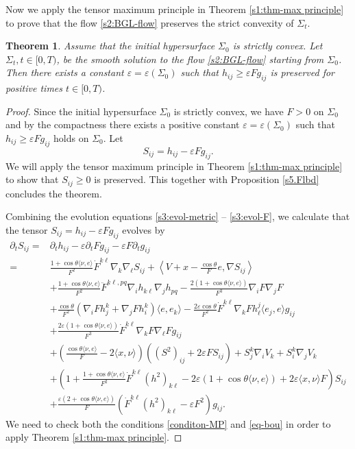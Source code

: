 \documentclass[11pt,reqno]{amsart}
\newtheorem{thm}{Theorem}[section]
\theoremstyle{definition}
\theoremstyle{remark}
\numberwithin{equation}{section}
\renewcommand{\(}{\left(}
\renewcommand{\)}{\right)}
\renewcommand{\-}{\overline}
\newcommand{\e}{\varepsilon}
\renewcommand{\t}{\theta}
\begin{document}
Now we apply the tensor maximum principle in Theorem \ref{s1:thm-max principle} to prove that the flow \eqref{s2:BGL-flow} preserves the strict convexity of $\Sigma_t$.
\begin{thm}\label{s4:thm-preserving-strict-convex}
Assume that the initial hypersurface $\Sigma_0$ is strictly convex. Let $\Sigma_t, t\in [0,T)$, be the smooth solution to the flow \eqref{s2:BGL-flow} starting from $\Sigma_0$. Then there exists a constant $\varepsilon=\varepsilon(\Sigma_0)$ such that $h_{ij}\geq \varepsilon Fg_{ij}$ is preserved for positive times $t\in[0,T)$.
\end{thm}
\begin{proof}
Since the initial hypersurface $\Sigma_0$ is strictly convex, we have $F>0$ on $\Sigma_0$ and by the compactness there exists a positive constant $\varepsilon=\varepsilon(\Sigma_0)$ such that $h_{ij}\geq \varepsilon Fg_{ij}$ holds on $\Sigma_0$.	Let
\begin{equation*}
  S_{ij}=h_{ij}-\varepsilon Fg_{ij}.
\end{equation*}
We will apply the tensor maximum principle in Theorem \ref{s1:thm-max principle} to show that $S_{ij}\geq 0$ is preserved. This together with Proposition \ref{s5.Flbd} concludes the theorem.
	
 Combining the evolution equations \eqref{s3:evol-metric} -- \eqref{s3:evol-F}, we calculate that the tensor $S_{ij}=h_{ij}-\e Fg_{ij}$ evolves by
		\begin{align}\label{s3:evol-Sij}
		\partial_tS_{ij}=&\partial_th_{ij}-\varepsilon \partial_tFg_{ij}-\varepsilon F\partial_tg_{ij}\nonumber\\
=&\frac{1+\cos\t\langle \nu,e\rangle}{F^2}\dot{F}^{k\ell}\nabla_k \nabla_\ell S_{ij}+\left\langle V+x-\frac{\cos\t}{F}e,\nabla S_{ij}\right\rangle\nonumber\\
		&+\frac{1+\cos\t\langle \nu,e\rangle}{F^2}\ddot{F}^{k\ell,pq}\nabla_i h_{k\ell}\nabla_j h_{pq} -\frac{2(1+\cos\t\langle \nu,e\rangle)}{F^3}\nabla_iF\nabla_jF\nonumber\\
		&+\frac{\cos\t}{F^2}(\nabla_i F h_j^k+\nabla_j F h_i^k)\langle e,e_k\rangle -\frac{2\varepsilon\cos\t}{F^2}\dot{F}^{k\ell}\nabla_k F h_\ell^j\langle e_j,e\rangle g_{ij}\nonumber\\
&+\frac{2\varepsilon\left(1+\cos\theta\langle\nu,e\rangle\right)}{F^3}\dot{F}^{k\ell}\nabla_kF\nabla_\ell F g_{ij}\nonumber\\
		&+\(\frac{\cos\t\langle \nu,e\rangle}{F}-2\langle x,\nu\rangle\) ((S^2)_{ij}+2\e FS_{ij})+S_j^k \nabla_i V_k+S_i^k\nabla_j V_k \nonumber\\
		&+\(1+\frac{1+\cos\t\langle \nu,e\rangle}{F^2}\dot{F}^{k\ell}(h^2)_{k\ell}-2\e(1+\cos\t\langle \nu,e\rangle)+2\e\langle x,\nu\rangle F\)S_{ij}\nonumber\\
		&+\frac{\e(2+\cos\t\langle \nu,e\rangle)}{F}\left(\dot{F}^{k\ell}(h^2)_{k\ell}-\e F^2\right)g_{ij}.
		\end{align}
We need to check both the conditions \eqref{conditon-MP} and \eqref{eq-bou} in order to apply Theorem \ref{s1:thm-max principle}.


\end{proof}
\end{document}
